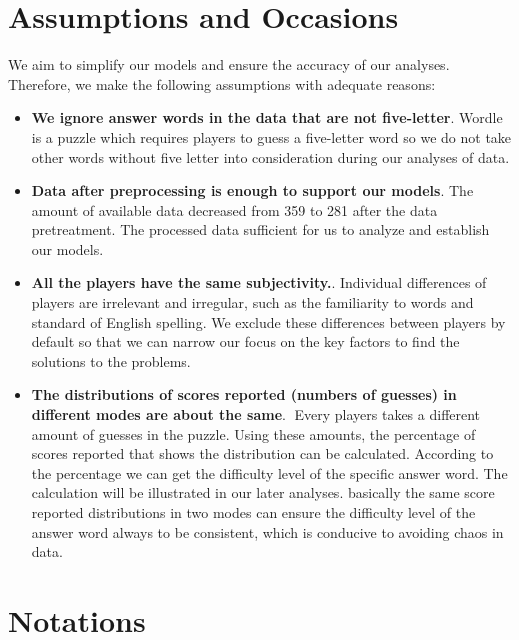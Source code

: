 \documentclass{mcmthesis}
\begin{document}
\section{Assumptions and Occasions}

We aim to simplify our models and ensure the accuracy of our analyses. Therefore, we make the following assumptions with adequate reasons: 

\begin{itemize}
\item {\bf We ignore answer words in the data that are not five-letter}. Wordle is a puzzle which requires players to guess a five-letter word so we do not take other words without five letter into consideration during our analyses of data.

\item {\bf Data after preprocessing is enough to support our models}. The amount of available data decreased from 359 to 281 after the data pretreatment. The processed data sufficient for us to analyze and establish our models.

\item {\bf All the players have the same subjectivity.}. Individual differences of players are irrelevant and irregular, such as the familiarity to words and standard of English spelling. We exclude these differences between players by default so that we can narrow our focus on the key factors to find the solutions to the problems.

\item {\bf The distributions of scores reported (numbers of guesses) in different modes are about the same}. Every players takes a different amount of guesses in the puzzle. Using these amounts, the percentage of scores reported that shows the distribution can be calculated. According to the percentage we can get the difficulty level of the specific answer word. The calculation will be illustrated in our later analyses. basically the same score reported distributions in two modes can ensure the difficulty level of the answer word always to be consistent, which is conducive to avoiding chaos in data. 
\end{itemize}

\section{Notations}
\end{document}
